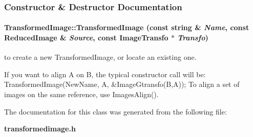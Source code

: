 \subsubsection{Constructor \& Destructor Documentation}
\paragraph{\setlength{\rightskip}{0pt plus 5cm}Transformed\-Image::Transformed\-Image (const string \& {\em Name}, const {\bf Reduced\-Image} \& {\em Source}, const Image\-Transfo $\ast$ {\em Transfo})}\hfill\label{class_transformedimage_a0}


to create a new Transformed\-Image, or locate an existing one.

If you want to align A on B, the typical constructor call will be: Transformed\-Image(New\-Name, A, \&Image\-Gtransfo(B,A)); To align a set of images on the same reference, use Images\-Align(). 

The documentation for this class was generated from the following file:\begin{CompactItemize}
\item 
{\bf transformedimage.h}\end{CompactItemize}
